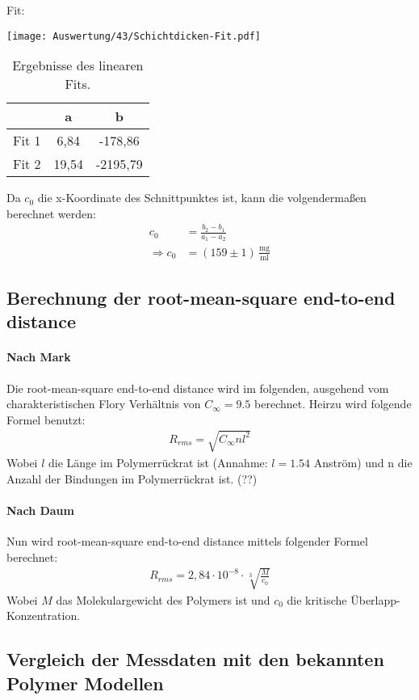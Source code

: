 Fit:
\begin{center}
	\captionsetup{type=figure}
	\texttt{[image: Auswertung/43/Schichtdicken-Fit.pdf]}
	\label{fig:fitgueteReflexion}
\end{center}

\begin{table}[h]
	\centering
	\begin{tabular}{r|c|c}
		& a & b \\ \hline
		Fit 1 & 6,84 & -178,86 \\
		Fit 2 & 19,54 & -2195,79
	\end{tabular}
	\caption[]{Ergebnisse des linearen Fits.}
\end{table}

Da $c_0$ die x-Koordinate des Schnittpunktes ist, kann die volgendermaßen berechnet werden:
\begin{align}
	c_0 &= \frac{b_2 - b_1}{a_1 - a_2}\\
	\Rightarrow c_0 &= (159 \pm 1) \, \frac{\text{mg}}{\text{ml}}
\end{align}

\subsection{Berechnung der root-mean-square end-to-end distance}

\paragraph*{Nach Mark}
Die root-mean-square end-to-end distance wird im folgenden, ausgehend vom charakteristischen Flory Verhältnis von $C_\infty = 9.5$ berechnet. Heirzu wird folgende Formel benutzt:
\begin{gather}
	R_{rms} = \sqrt{C_\infty n l^2}
\end{gather}
Wobei $l$ die Länge im Polymerrückrat ist (Annahme: $l = 1.54$ Anström) und n die Anzahl der Bindungen im Polymerrückrat ist. (??)

\paragraph*{Nach Daum}
Nun wird root-mean-square end-to-end distance mittels folgender Formel berechnet:
\begin{gather}
	R_{rms} = 2,84 \cdot 10^{-8} \cdot \sqrt[3]{\frac{M}{c_0}}
\end{gather}
Wobei $M$ das Molekulargewicht des Polymers ist und $c_0$ die kritische Überlapp-Konzentration.

\subsection{Vergleich der Messdaten mit den bekannten Polymer Modellen}